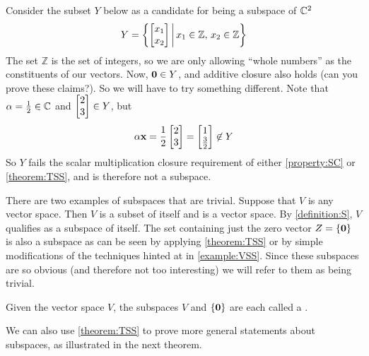 \documentclass{ximera}
\begin{document}
\begin{example}

  Consider the subset $Y$ below as a candidate for being a subspace of $\mathbb{C}^{2}$
  \[
    Y=\left\lbrace\begin{bmatrix}x_1\\x_2\end{bmatrix}\,\middle|\,x_1\in{\mathbb Z},\,x_2\in{\mathbb Z}\right\rbrace
  \]
  The set ${\mathbb Z}$ is the set of integers, so we are only
  allowing ``whole numbers'' as the constituents of our vectors.  Now,
  $\mathbf{0}\in Y$, and additive closure also holds (can you prove
  these claims?).  So we will have to try something different.  Note
  that $\alpha = \frac{1}{2}\in\mathbb{C}$ and
  $\begin{bmatrix}2\\3\end{bmatrix}\in Y$, but
  \[
    \alpha\mathbf{x}=\frac{1}{2}\begin{bmatrix}2\\3\end{bmatrix}=\begin{bmatrix}1\\\frac{3}{2}\end{bmatrix}\not\in Y
  \]
  So $Y$ fails the scalar multiplication closure requirement of either
  \ref{property:SC} or \ref{theorem:TSS}, and is therefore not a
  subspace.
\end{example}

There are two examples of subspaces that are trivial.  Suppose that
$V$ is any vector space.  Then $V$ is a subset of itself and is a
vector space.  By \ref{definition:S}, $V$ qualifies as a subspace of
itself.  The set containing just the zero vector $Z=\left\{\mathbf{0}\right\}$
is also a subspace as can be seen by applying \ref{theorem:TSS} or by
simple modifications of the techniques hinted at in \ref{example:VSS}.
Since these subspaces are so obvious (and therefore not too
interesting) we will refer to them as being trivial.

\begin{definition}
  Given the vector space $V$, the subspaces $V$ and
  $\left\{\mathbf{0}\right\}$ are each called a .
\end{definition}

We can also use \ref{theorem:TSS} to prove more general statements
about subspaces, as illustrated in the next theorem.
\end{document}
